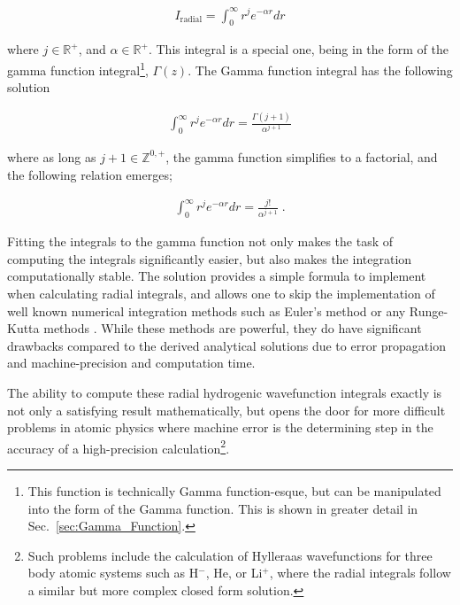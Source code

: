            \begin{align}
                I_{\text{radial}} = \int_0^\infty r^j e^{-\alpha r} dr
            \end{align}

            \noindent where $j \in \mathbb{R^+}$, and $\alpha \in \mathbb{R^+}$. This integral is a special one, being in the form of the gamma function integral\footnote{This function is technically Gamma function-esque, but can be manipulated into the form of the Gamma function. This is shown in greater detail in Sec.~\ref{sec:Gamma_Function}.}, $\Gamma(z)$. The Gamma function integral has the following solution 

            \begin{align}
                \int_0^\infty r^j e^{-\alpha r} dr = \frac{\Gamma(j + 1)}{\alpha^{j + 1}}
            \end{align}

            \noindent where as long as $j + 1 \in \mathbb{Z}^{0,+}$, the gamma function simplifies to a factorial, and the following relation emerges;

            \begin{align}
                \int_0^\infty r^j e^{-\alpha r} dr = \frac{j!}{\alpha^{j + 1}}\;.
            \end{align}

            \noindent Fitting the integrals to the gamma function not only makes the task of computing the integrals significantly easier, but also makes the integration computationally stable. The solution provides a simple formula to implement when calculating radial integrals, and allows one to skip the implementation of well known numerical integration methods such as Euler's method or any Runge-Kutta methods \cite{Numerical_recipes}. While these methods are powerful, they do have significant drawbacks compared to the derived analytical solutions due to error propagation and machine-precision and computation time.
            
            The ability to compute these radial hydrogenic wavefunction integrals exactly is not only a satisfying result mathematically, but opens the door for more difficult problems in atomic physics where machine error is the determining step in the accuracy of a high-precision calculation\footnote{Such problems include the calculation of Hylleraas wavefunctions for three body atomic systems such as H$^-$, He, or Li$^+$, where the radial integrals follow a similar but more complex closed form solution.}.
            
